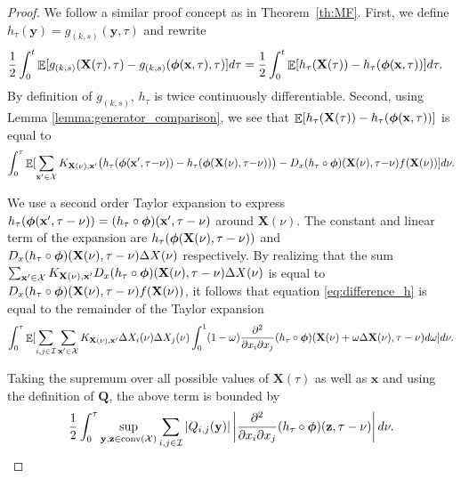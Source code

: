 \documentclass[acmsmall]{acmart}
\newcommand\bx{\mathbf{x}}
\newcommand\bX{\mathbf{X}}
\newcommand\by{\mathbf{y}}
\newcommand\bz{\mathbf{z}}
\newcommand\bphi{\text{\boldmath$\phi$}}
\newcommand\bQ{\mathbf{Q}}
\newcommand\calX{\mathcal{X}}
\newcommand\calI{\mathcal{I}}
\DeclareMathOperator{\E}{\mathbb{E}} %
\newcommand\conv[1]{\mathrm{conv}(#1)}      %
\newcommand\abs[1]{\left|#1\right|}         %
\begin{document}
\begin{proof}

We follow a similar proof concept as in Theorem~\ref{th:MF}. First, we define $h_\tau(\by) = g_{(k,s)}(\by,\tau)$ and rewrite 
\begin{align}
\label{eq:difference_g}
& \frac{1}{2}\int_0^t \E [ g_{(k,s)}(\bX(\tau),\tau) - g_{(k,s)}(\bphi(\bx, \tau),\tau)]d\tau = \frac{1}{2} \int_0^t \E [h_\tau (\bX(\tau)) - h_\tau(\bphi(\bx, \tau))]d\tau. 
\end{align}
By definition of $g_{(k,s)}$, $h_\tau$ is twice continuously differentiable. Second, using Lemma \ref{lemma:generator_comparison}, we see that $\E [h_\tau (\bX(\tau)) - h_\tau(\bphi(\bx, \tau))]$ is equal to 
\begin{align}
  \int_0^\tau \E[ \sum_{\bx'\in \calX} K_{\bX(\nu),\bx'} \bigl( h_\tau(\bphi(\bx',\tau{-}\nu)) -  h_\tau(\bphi(\bX(\nu),\tau{-}\nu)) \bigr) 
  - D_x(h_\tau \circ \bphi)(\bX(\nu),\tau{-}\nu) f(\bX(\nu)) ]d\nu.
  \label{eq:difference_h}
\end{align}


We use a second order Taylor expansion to express $h_\tau(\bphi(\bx',\tau-\nu)) = (h_\tau \circ \bphi)(\bx', \tau - \nu)$ around $\bX(\nu)$. The constant and linear term of the expansion are $h_\tau(\bphi(\bX(\nu),\tau-\nu))$ and \\ $D_x (h_\tau \circ \bphi)(\bX(\nu),\tau-\nu)\Delta X(\nu)$ respectively. By realizing that the sum $\sum_{\bx'\in \calX} K_{\bX(\nu),\bx'}D_x (h_\tau \circ \bphi)(\bX(\nu),\tau-\nu) \Delta X(\nu)$ is equal to $D_x(h_\tau \circ \bphi)(\bX(\nu),\tau-\nu)f(\bX(\nu))$, it follows that equation \eqref{eq:difference_h} is equal to the remainder of the Taylor expansion
\begin{align*}
  \int_0^\tau \E[ \sum_{i,j \in \calI}\sum_{\bx' \in \calX} K_{\bX(\nu),\bx'} \Delta X_i(\nu)\Delta X_j (\nu) \int_0^1 (1-\omega)\frac{\partial^2}{\partial x_i \partial x_j}(h_\tau \circ \bphi)(\bX(\nu) + \omega\Delta \bX(\nu), \tau - \nu) d\omega]d\nu.
\end{align*}

Taking the supremum over all possible values of $\bX(\tau)$ as well as $\bx$ and using the definition of $\bQ$, the above term is bounded by
\begin{align}
\label{eq:bound_refinement_taylor}
\frac{1}{2}\int_0^\tau \sup_{\by,\bz \in \conv{\calX}} \sum_{i,j\in \calI}\abs{Q_{i,j}(\by)}\abs{\frac{\partial^2}{\partial x_i \partial x_j} (h_\tau \circ \bphi)(\bz,\tau-\nu)} d\nu.
\end{align}


\end{proof}
\end{document}
